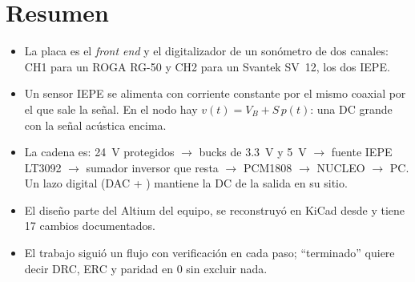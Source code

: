 \section*{Resumen}
\begin{itemize}
  \item La placa es el \emph{front end} y el digitalizador de un sonómetro de dos canales: CH1 para un ROGA RG-50 y CH2 para un Svantek SV~12, los dos IEPE.
  \item Un sensor IEPE se alimenta con corriente constante por el mismo coaxial por el que sale la señal. En el nodo hay $v(t)=V_B+S\,p(t)$: una DC grande con la señal acústica encima.
  \item La cadena es: \SI{24}{\volt} protegidos $\to$ bucks de \SI{3.3}{\volt} y \SI{5}{\volt} $\to$ fuente IEPE LT3092 $\to$ sumador inversor que resta  $\to$ PCM1808 $\to$ NUCLEO $\to$ PC. Un lazo digital (DAC + ) mantiene la DC de la salida en su sitio.
  \item El diseño parte del Altium del equipo, se reconstruyó en KiCad desde  y tiene 17 cambios documentados.
  \item El trabajo siguió un flujo con verificación en cada paso; ``terminado'' quiere decir DRC, ERC y paridad en 0 sin excluir nada.
\end{itemize}
